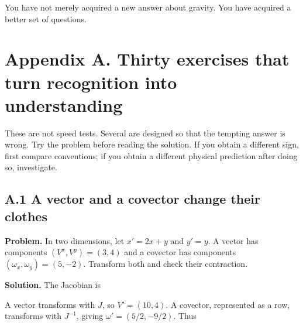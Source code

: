 \documentclass[
  11pt,
  letterpaper,
  oneside,
  openany]{scrbook}
\begin{document}
You have not merely acquired a new answer about gravity. You have
acquired a better set of questions.

\hypertarget{appendix-a}{%
\chapter{Appendix A. Thirty exercises that turn recognition into
understanding}\label{appendix-a}}

These are not speed tests. Several are designed so that the tempting
answer is wrong. Try the problem before reading the solution. If you
obtain a different sign, first compare conventions; if you obtain a
different physical prediction after doing so, investigate.

\hypertarget{a.1-a-vector-and-a-covector-change-their-clothes}{%
\section{A.1 A vector and a covector change their
clothes}\label{a.1-a-vector-and-a-covector-change-their-clothes}}

\textbf{Problem.} In two dimensions, let \(x'=2x+y\) and \(y'=y\). A
vector has components \((V^x,V^y)=(3,4)\) and a covector has components
\((\omega_x,\omega_y)=(5,-2)\). Transform both and check their
contraction.

\textbf{Solution.} The Jacobian is

\begin{center}
\begingroup
{}
\ifdim\wd\grmathbox>\linewidth
\resizebox{\linewidth}{!}{\usebox{\grmathbox}}
\else\usebox{\grmathbox}\fi
\endgroup
\end{center}

A vector transforms with \(J\), so \(V'=(10,4)\). A covector,
represented as a row, transforms with \(J^{-1}\), giving
\(\omega'=(5/2,-9/2)\). Thus

\begin{center}
\begingroup
{}
\ifdim\wd\grmathbox>\linewidth
\resizebox{\linewidth}{!}{\usebox{\grmathbox}}
\else\usebox{\grmathbox}\fi
\endgroup
\end{center}
\end{document}

